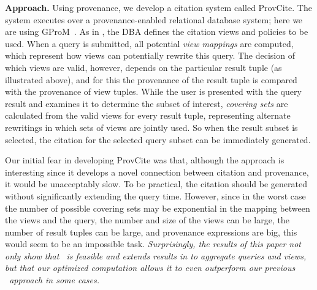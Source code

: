 \textbf{Approach.} Using provenance, we develop a citation system called ProvCite. The system executes over a provenance-enabled relational database system; here we are using GProM~\cite{arab2018gprom}.
As in \cite{wu2018data}, the DBA defines the citation views and policies to be used.  When a query is submitted, all potential {\em view mappings} are computed, which represent how views can potentially rewrite this query.  The decision of which views are valid, however, depends on the particular result tuple (as illustrated above), and for this the provenance of the result tuple is compared with the provenance of view tuples. While the user is presented with the query result and examines it to determine the subset of interest, \textit{covering sets} are calculated from the valid views for every result tuple, representing alternate rewritings in which sets of views are jointly used. So when the result subset is selected, the citation for the selected query subset can be immediately generated.   

Our initial fear in developing ProvCite was that, although the approach is interesting since it develops a novel connection between citation and provenance, it would be unacceptably slow.
To be practical, the citation should be generated without significantly extending the query time.
However, since in the worst case the number of possible covering sets may be exponential in the mapping between the views and the query, the number and size of the views can be large, the number of result tuples can be large, and provenance expressions are big, this would seem to be an impossible task.  \textit{Surprisingly, the results of this paper not only show that \pba\ is feasible and extends results in \cite{wu2018data} to aggregate queries and views, but that our optimized computation allows it to even outperform our previous \rba\ approach in some cases.}


